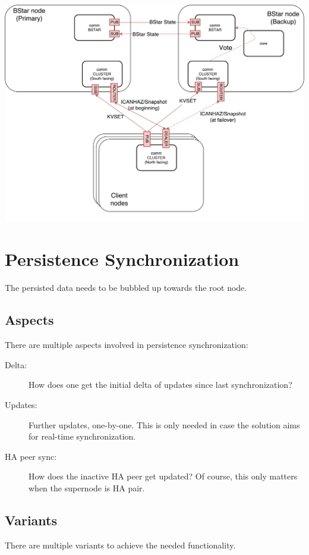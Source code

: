 \includegraphics[width=\textwidth]{img/ML-HA_bstar.pdf}

\section{Persistence Synchronization}\label{sec:meth:psync}
The persisted data needs to be bubbled up towards the root node.

\subsection{Aspects}
There are multiple aspects involved in persistence synchronization:

\begin{description}
	\item [Delta:]
		How does one get the initial delta of updates since last
		synchronization?

	\item [Updates:]
		Further updates, one-by-one. This is only needed in
		case the solution aims for real-time synchronization.

	\item [HA peer sync:]
		How does the inactive HA peer get updated? Of
		course, this only matters when the supernode is HA pair.
\end{description}

\subsection{Variants}
There are multiple variants to achieve the needed functionality.

